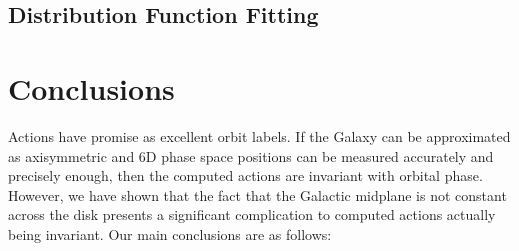 \documentclass[twocolumn]{aastex62}
\begin{document}
\subsection{Distribution Function Fitting}
\label{ssec:df}


\section{Conclusions}\label{sec:conclusion}
Actions have promise as excellent orbit labels. If the Galaxy can be
approximated as axisymmetric and 6D phase space positions can be measured
accurately and precisely enough, then the computed actions are invariant with
orbital phase. However, we have shown that the fact that the Galactic midplane
is not constant across the disk presents a significant complication to
computed actions actually being invariant. Our main conclusions are as
follows:
\end{document}
